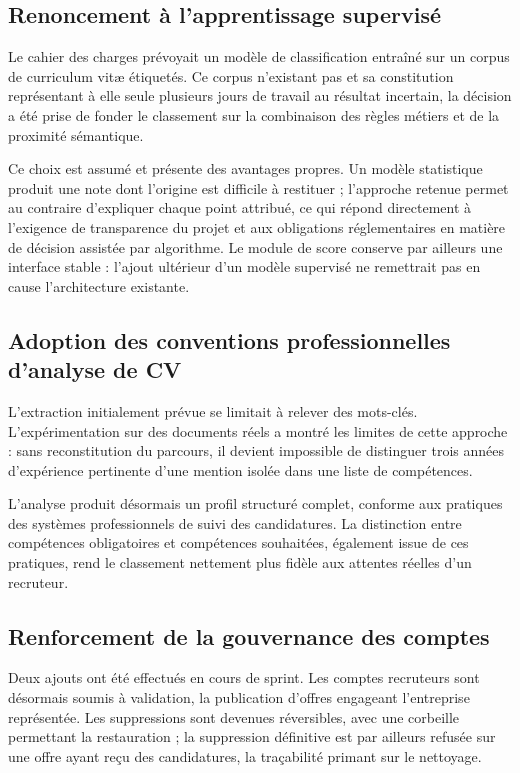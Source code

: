 \documentclass[11pt,a4paper]{article}
\begin{document}
\subsection{Renoncement à l'apprentissage supervisé}
Le cahier des charges prévoyait un modèle de classification entraîné sur un corpus de curriculum vitæ étiquetés. Ce corpus n'existant pas et sa constitution représentant à elle seule plusieurs jours de travail au résultat incertain, la décision a été prise de fonder le classement sur la combinaison des règles métiers et de la proximité sémantique.

Ce choix est assumé et présente des avantages propres. Un modèle statistique produit une note dont l'origine est difficile à restituer ; l'approche retenue permet au contraire d'expliquer chaque point attribué, ce qui répond directement à l'exigence de transparence du projet et aux obligations réglementaires en matière de décision assistée par algorithme. Le module de score conserve par ailleurs une interface stable : l'ajout ultérieur d'un modèle supervisé ne remettrait pas en cause l'architecture existante.

\subsection{Adoption des conventions professionnelles d'analyse de CV}
L'extraction initialement prévue se limitait à relever des mots-clés. L'expérimentation sur des documents réels a montré les limites de cette approche : sans reconstitution du parcours, il devient impossible de distinguer trois années d'expérience pertinente d'une mention isolée dans une liste de compétences.

L'analyse produit désormais un profil structuré complet, conforme aux pratiques des systèmes professionnels de suivi des candidatures. La distinction entre compétences obligatoires et compétences souhaitées, également issue de ces pratiques, rend le classement nettement plus fidèle aux attentes réelles d'un recruteur.

\subsection{Renforcement de la gouvernance des comptes}
Deux ajouts ont été effectués en cours de sprint. Les comptes recruteurs sont désormais soumis à validation, la publication d'offres engageant l'entreprise représentée. Les suppressions sont devenues réversibles, avec une corbeille permettant la restauration ; la suppression définitive est par ailleurs refusée sur une offre ayant reçu des candidatures, la traçabilité primant sur le nettoyage.
\end{document}
